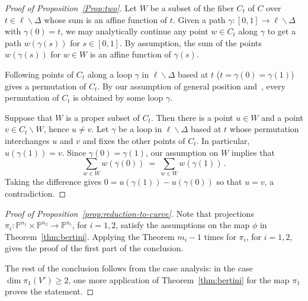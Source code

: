\documentclass[12pt]{amsart}
\theoremstyle{definition}
\begin{document}
\begin{proof}[Proof of Proposition~\ref{Prop:two}]
 Let $W$ be a subset of the fiber $C_t$ of $C$ over
 $t\in\ell\smallsetminus\Delta$ whose sum is an affine function of $t$.
 Given a path $\gamma\colon[0,1]\to\ell\smallsetminus\Delta$ with $\gamma(0)=t$, we may analytically
 continue any point $w\in C_t$ along $\gamma$ to get a path $w(\gamma(s))$ for
 $s\in[0,1]$.
 By assumption, the sum of the points $w(\gamma(s))$ for $w\in W$ is an affine function of $\gamma(s)$.

 Following points of $C_t$ along a loop $\gamma$ in $\ell\smallsetminus\Delta$ based at $t$
 ($t=\gamma(0)=\gamma(1)$) gives a permutation of $C_t$.
 By our assumption of general position
 and~\cite[Lemma on page 111]{Arbarello-Cornalba-Griffiths-Harris},
 every permutation of $C_t$ is obtained by some loop $\gamma$.

 Suppose that $W$ is a proper subset of $C_t$.
 Then there is a point $u\in W$ and a point $v\in C_t\smallsetminus W$, hence $u\neq v$.
 Let $\gamma$ be a loop in $\ell\smallsetminus\Delta$ based at $t$ whose permutation interchanges $u$ and
 $v$ and fixes the other points of $C_t$.
 In particular, $u(\gamma(1))=v$.
 Since $\gamma(0)=\gamma(1)$, our assumption on $W$ implies that
\[
   \sum_{w\in W} w(\gamma(0))\ =\ \sum_{w\in W} w(\gamma(1))\,.
\]
Taking the difference gives $0=u(\gamma(1))-u(\gamma(0))$ so that $u=v$, a contradiction.
\end{proof}

\begin{proof}[Proof of Proposition~\ref{prop:reduction-to-curve}]
Note that projections $\pi_i:{{\mathbb{P}}}^{n_1}\times {{\mathbb{P}}}^{n_2}\to{{\mathbb{P}}}^{n_i}$, for $i=1,2$, satisfy the assumptions on the map $\phi$ in Theorem~\ref{thm:bertini}.
Applying the Theorem $m_i-1$ times for $\pi_i$, for $i=1,2$, gives the proof of the first part of the conclusion.

The rest of the conclusion follows from the case analysis: in the case $\dim\pi_1(V')\geq 2$, one more application of Theorem~\ref{thm:bertini} for the map $\pi_1$ proves the statement.
\end{proof}
\end{document}
